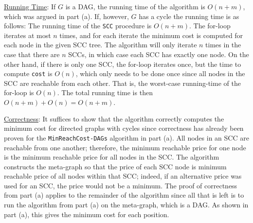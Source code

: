 \documentclass[twoside,11pt]{homework}
\begin{document}
\begin{enumerate}[\bf (a)]
\noindent
\underline{Running Time}: If $G$ is a DAG, the running time of the algorithm is $O(n+m)$, which was argued in part (a).  If, however, $G$ has a cycle the running time is as follows: 
The running time of the \texttt{SCC} procedure is $O(n+m)$.  The for-loop iterates at most $n$ times, and for each iterate the minimum cost is computed for each node in the given SCC tree.  The algorithm will only iterate $n$ times in the case that there are $n$ SCCs,  in which case each SCC has exactly one node.  On the other hand, if there is only one SCC, the for-loop iterates once,  but the time to compute \texttt{cost} is $O(n)$, which only needs to be done once since all nodes in the SCC are reachable from each other.  That is, the worst-case running-time of the for-loop is $O(n)$.  The total running time is then $O(n+m) + O(n) = O(n+m)$. 

\noindent
\underline{Correctness}: It suffices to show that the algorithm correctly computes the minimum cost for directed graphs with cycles since correctness has already been proven for the \texttt{MinReachCost-DAGs} algorithm in part (a).  All nodes in an SCC are reachable from one another; therefore,  the minimum reachable price for one node is the minimum reachable price for all nodes in the SCC.   The algorithm constructs the meta-graph so that the price of each SCC node is minimum reachable price of all nodes within that SCC; indeed, if an alternative price was used for an SCC, the price would not be a minimum.  The proof of correctness from part (a) applies to the remainder of the algorithm since all that is left is to run the algorithm from part (a) on the meta-graph, which is a DAG. As shown in part (a), this gives the minimum cost for each position. 




\end{enumerate}




\end{document}
